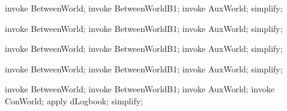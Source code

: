 \begin{LPScript}\begin{zproof}[lBetweenWorldFromInEpaExpansion]
    invoke BetweenWorld;
    invoke BetweenWorldB1;
    invoke AuxWorld;
    simplify;
\end{zproof}\end{LPScript}

\begin{LPScript}\begin{zproof}[lBetweenWorldAllLogsExpansion]
    invoke BetweenWorld;
    invoke BetweenWorldB1;
    invoke AuxWorld;
    simplify;
\end{zproof}\end{LPScript}

\begin{LPScript}\begin{zproof}[lBetweenWorldDefinitelyLostExpansion]
    invoke BetweenWorld;
    invoke BetweenWorldB1;
    invoke AuxWorld;
    simplify;
\end{zproof}\end{LPScript}

\begin{LPScript}\begin{zproof}[lBetweenWorldMaybeLostExpansion]
    invoke BetweenWorld;
    invoke BetweenWorldB1;
    invoke AuxWorld;
    simplify;
\end{zproof}\end{LPScript}

\begin{LPScript}\begin{zproof}[lBetweenWorldArchiveExpansion]
    invoke BetweenWorld;
    invoke BetweenWorldB1;
    invoke AuxWorld;
    invoke ConWorld;
    apply dLogbook;
    simplify;
\end{zproof}\end{LPScript}

